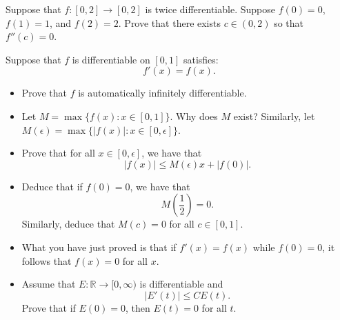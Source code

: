   \begin{exercise}
    Suppose that $f : [0, 2] \to [0, 2]$ is twice differentiable. Suppose $f(0) = 0$, $f(1) = 1$, and $f(2) = 2$. Prove that there exists $c \in (0, 2)$ so that $f''(c) = 0$.
  \end{exercise}
  \begin{solution}

  \end{solution}

  \begin{exercise}
    Suppose that $f$ is differentiable on $[0, 1]$ satisfies:
    \begin{equation}
      f'(x) = f(x).
    \end{equation}
    
    \begin{itemize}
      \item Prove that $f$ is automatically infinitely differentiable.
      
      \item Let $M = \max\{f(x) : x \in [0, 1]\}$. Why does $M$ exist? Similarly, let $M(\epsilon) = \max\{|f(x)| : x \in [0, \epsilon]\}$.
      
      \item Prove that for all $x \in [0, \epsilon]$, we have that
      \begin{equation}
        |f(x)| \leq M(\epsilon)x + |f(0)|.
      \end{equation}
      
      \item Deduce that if $f(0) = 0$, we have that
      \begin{equation}
        M\left(\frac{1}{2}\right) = 0.
      \end{equation}
      Similarly, deduce that $M(c) = 0$ for all $c \in [0, 1]$.
      
      \item What you have just proved is that if $f'(x) = f(x)$ while $f(0) = 0$, it follows that $f(x) = 0$ for all $x$.
      
      \item Assume that $E : \mathbb{R} \to [0, \infty)$ is differentiable and
      \begin{equation}
        |E'(t)| \leq CE(t).
      \end{equation}
      Prove that if $E(0) = 0$, then $E(t) = 0$ for all $t$.
    \end{itemize}
  \end{exercise}
  \begin{solution}

  \end{solution}

